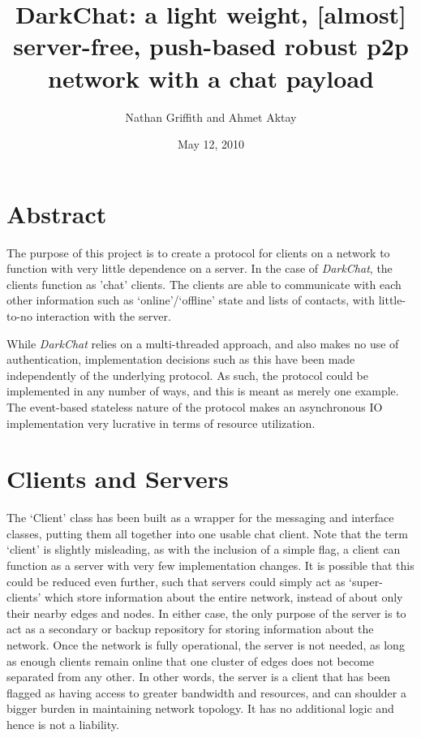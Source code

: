 \documentclass[11pt]{article}
\title{DarkChat: a light weight, [almost] server-free, push-based robust p2p network with a chat payload}
\author{Nathan Griffith and Ahmet Aktay}
\date{May 12, 2010}
\begin{document}
\maketitle %




\section{Abstract}

The purpose of this project is to create a protocol for clients on a network to function with very little dependence on a server. In the case of \emph{DarkChat}, the clients function as 'chat' clients. The clients are able to communicate with each other information such as `online'/`offline' state and lists of contacts, with little-to-no interaction with the server.

While \emph{DarkChat} relies on a multi-threaded approach, and also makes no use of authentication, implementation decisions such as this have been made independently of the underlying protocol. As such, the protocol could be implemented in any number of ways, and this is meant as merely one example. The event-based stateless nature of the protocol makes an asynchronous IO implementation very lucrative in terms of resource utilization.

\section{Clients and Servers}

The `Client' class has been built as a wrapper for the messaging and interface classes, putting them all together into one usable chat client. Note that the term `client' is slightly misleading, as with the inclusion of a simple flag, a client can function as a server with very few implementation changes. It is possible that this could be reduced even further, such that servers could simply act as `super-clients' which store information about the entire network, instead of about only their nearby edges and nodes.
In either case, the only purpose of the server is to act as a secondary or backup repository for storing information about the network. Once the network is fully operational, the server is not needed, as long as enough clients remain online that one cluster of edges does not become separated from any other. In other words, the server is a client that has been flagged as having access to greater bandwidth and resources, and can shoulder a bigger burden in maintaining network topology. It has no additional logic and hence is not a liability.
\end{document}
